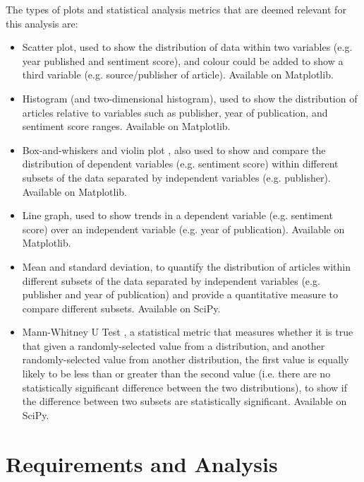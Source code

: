 \documentclass{report}
\begin{document}
The types of plots and statistical analysis metrics that are deemed relevant for this analysis are:
\begin{itemize}
	\item Scatter plot, used to show the distribution of data within two variables (e.g. year published and sentiment score), and colour could be added to show a third variable (e.g. source/publisher of article).
		Available on Matplotlib.
	\item Histogram (and two-dimensional histogram), used to show the distribution of articles relative to variables such as publisher, year of publication, and sentiment score ranges. 
		Available on Matplotlib.
	\item Box-and-whiskers \cite{tukey1977exploratory} and violin plot \cite{hintze1998violin}, also used to show and compare the distribution of dependent variables (e.g. sentiment score) within different subsets of the data separated by independent variables (e.g. publisher).
		Available on Matplotlib.
	\item Line graph, used to show trends in a dependent variable (e.g. sentiment score) over an independent variable (e.g. year of publication).
		Available on Matplotlib.
	\item Mean and standard deviation, to quantify the distribution of articles within different subsets of the data separated by independent variables (e.g. publisher and year of publication) and provide a quantitative measure to compare different subsets.
		Available on SciPy.
	\item Mann-Whitney U Test \cite{mann1947test}, a statistical metric that measures whether it is true that given a randomly-selected value from a distribution, and another randomly-selected value from another distribution, the first value is equally likely to be less than or greater than the second value (i.e. there are no statistically significant difference between the two distributions), to show if the difference between two subsets are statistically significant.
		Available on SciPy.
\end{itemize}

\chapter{Requirements and Analysis} \label{Requirements and Analysis}  %

\end{document}
